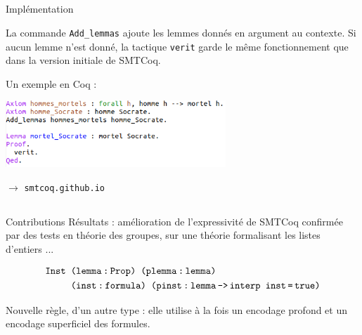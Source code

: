 \documentclass{beamer}
\begin{document}
    \subsection{}
    \begin{frame}{Implémentation}

      La commande \texttt{Add\_lemmas} ajoute les lemmes donnés en argument au contexte. Si aucun lemme n'est donné, la tactique \texttt{verit} garde le même fonctionnement que dans la version initiale de SMTCoq.

      \vspace{3mm}
      Un exemple en Coq :

      \begin{center}
        \includegraphics[height=2.5cm]{socrate.png}
      \end{center}
      \vspace{3mm}

      $\longrightarrow $ \texttt{smtcoq.github.io}


    \end{frame}

    \subsection{}
    \begin{frame}{Contributions}
      Résultats : amélioration de l'expressivité de SMTCoq confirmée par des tests en théorie des groupes, sur une théorie formalisant les listes d'entiers ...

      \vspace{3mm}

      \begin{align*}
        \texttt{Inst } &\texttt{(lemma\,:\,Prop) (plemma\,:\,lemma)} \\
        &\texttt{(inst\,:}\texttt{\,formula) (pinst\,:\,lemma\,->\,interp inst\,=\,true)}
      \end{align*}

      \vspace{5mm}

      Nouvelle règle, d'un autre type : elle utilise à la fois un encodage profond et un encodage superficiel des formules.

      
    \end{frame}
\end{document}
